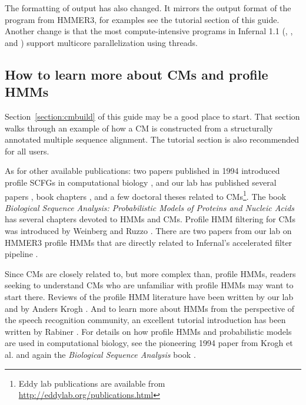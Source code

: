 The formatting of  output has also changed. It mirrors
the output format of the  program from HMMER3, for
examples see the tutorial section of this guide. Another change is
that the most compute-intensive programs in Infernal 1.1
(, ,  and
) support multicore parallelization using threads.

\subsection{How to learn more about CMs and profile HMMs}

Section~\ref{section:cmbuild} of this guide may be a good place to
start. That section walks through an example of how a CM is
constructed from a structurally annotated multiple sequence alignment.
The tutorial section is also recommended for all users.

As for other available publications: two papers published in 1994
introduced profile SCFGs in computational biology
\citep{Sakakibara94c,Eddy94}, and our lab has published several papers
\citep{Eddy02b,KleinEddy03,NawrockiEddy07,Nawrocki09,KolbeEddy09,KolbeEddy11},
book chapters \citep{Eddy06b,NawrockiEddy09}, and a few doctoral
theses \citep{Klein03,Nawrocki09b,Kolbe10} related to
CMs\footnote{Eddy lab publications are available from
\url{http://eddylab.org/publications.html}}. The book
\emph{Biological Sequence Analysis: Probabilistic Models of Proteins
and Nucleic Acids} \citep{Durbin98} has several chapters devoted to
HMMs and CMs. Profile HMM filtering for CMs was introduced by Weinberg
and Ruzzo
\citep{WeinbergRuzzo04,WeinbergRuzzo04b,WeinbergRuzzo06}. There are
two papers from our lab on HMMER3 profile HMMs that are directly
related to Infernal's accelerated filter pipeline
\citep{Eddy08,Eddy11}.

Since CMs are closely related to, but more complex than, profile HMMs,
readers seeking to understand CMs who are unfamiliar with profile HMMs
may want to start there.  Reviews of the profile HMM literature have
been written by our lab \citep{Eddy96,Eddy98} and by Anders Krogh
\citep{Krogh98}. And to learn more about HMMs from the perspective of
the speech recognition community, an excellent tutorial introduction
has been written by Rabiner \citep{Rabiner89}. For details on how
profile HMMs and probabilistic models are used in computational
biology, see the pioneering 1994 paper from Krogh et
al. \citep{Krogh94} and again the \emph{Biological Sequence Analysis}
book \citep{Durbin98}.

